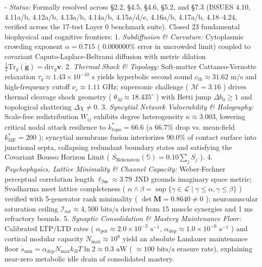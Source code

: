 \documentclass[11pt,a4paper]{article}
\theoremstyle{definition}
\theoremstyle{remark}
\begin{document}
- \textit{Status:} Formally resolved across \S 2.2, \S 4.5, \S 4.6, \S 5.2, and \S 7.3 (ISSUES 4.10, 4.11a/b, 4.12a/b, 4.13a/b, 4.14a/b, 4.15a/d/e, 4.16a/b, 4.17a/b, 4.18–4.24, verified across the 17-test Layer 0 benchmark suite). Closed 23 fundamental biophysical and cognitive frontiers:
1. \textit{Subdiffusion \& Curvature:} Cytoplasmic crowding exponent $\alpha = 0.715$ ( $0.000000\%$ error in uncrowded limit) coupled to covariant Caputo-Laplace-Beltrami diffusion with metric dilation $\frac{1}{2}\mathrm{Tr}_g(\dot{\mathbf{g}}) = \mathrm{div}_g \mathbf{v}$.
2. \textit{Thermal Shock \& Topology:} Soft-matter Cattaneo-Vernotte relaxation $\tau_q \approx 1.43 \times 10^{-10}\text{ s}$ yields hyperbolic second sound $c_{\text{th}} \approx 31.62\text{ m/s}$ and high-frequency cutoff $\nu_c \approx 1.11\text{ GHz}$; supersonic challenge ( $\mathcal{M} = 3.16$ ) drives thermal cleavage shock geometry ( $\theta_M \approx 18.435^\circ$ ) with Betti jump $\Delta b_0 \ge 1$ and topological shattering $\Delta \chi \neq 0$.
3. \textit{Syncytial Network Vulnerability \& Holography:} Scale-free redistribution $W_{ij}$ exhibits degree heterogeneity $\kappa \approx 3.003$, lowering critical nodal attack resilience to $k^*_{\text{topo}} = 66.6$ (a $66.7\%$ drop vs. mean-field $k^*_{\text{MF}} = 200$ ); syncytial membrane fusion interiorizes $90.0\%$ of contact surface into junctional septa, collapsing redundant boundary states and satisfying the Covariant Bousso Horizon Limit ( $S_{\text{Bekenstein}}(\mathbb{S}) = 0.10 \sum_j S_j$ ).
4. \textit{Psychophysics, Lattice Minimality \& Channel Capacity:} Weber-Fechner perceptual correlation length $\ell_{\mathfrak{Im}} \approx 3.79\text{ JND}$ grounds imaginary space metric; Svadharma meet lattice completeness ( $\alpha \wedge \beta = \sup \{ \gamma \in \mathcal{L} \mid \gamma \le \alpha, \gamma \le \beta \}$ ) verified with 5-generator rank minimality ( $\det \mathbf{M} = 0.8640 \neq 0$ ); neuromuscular saturation ceiling $\mathcal{I}_{\text{sat}} \approx 4{,}500\text{ bits/s}$ derived from 15 muscle synergies and 1 ms refractory bounds.
5. \textit{Synaptic Consolidation \& Mastery Maintenance Floor:} Calibrated LTP/LTD rates ( $\alpha_{\text{pot}} \approx 2.0 \times 10^{-3}\text{ s}^{-1}$, $\alpha_{\text{dep}} \approx 1.0 \times 10^{-6}\text{ s}^{-1}$ ) and cortical modular capacity $N_{\max} \approx 10^8$ yield an absolute Landauer maintenance floor $\dot{s}_{\min} = \alpha_{\text{dep}} N_{\max} k_B T \ln 2 \approx 0.3\text{ aW}$ ( $\approx 100\text{ bits/s}$ erasure rate), explaining near-zero metabolic idle drain of consolidated mastery.
\end{document}
